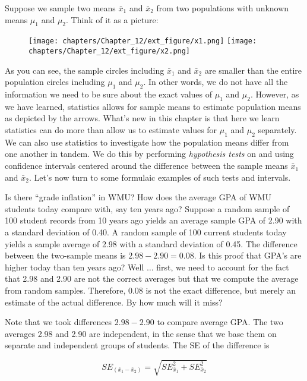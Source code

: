 \documentclass[11pt]{book}\usepackage[]{graphicx}\usepackage[]{color}
\begin{document}
Suppose we sample two means $\bar{x}_1$ and $\bar{x}_2$  from two populations with unknown means $\mu_1$ and $\mu_2$. Think of it as a picture:

\begin{figure}[ht]
\centering
\texttt{[image: chapters/Chapter\_12/ext\_figure/x1.png]} %
\texttt{[image: chapters/Chapter\_12/ext\_figure/x2.png]} %
\end{figure}

As you can see, the sample circles including $\bar{x}_1$ and $\bar{x}_2$ are smaller than the entire population circles including $\mu_1$ and $\mu_2$. In other words, we do not have all the information we need to be sure about the exact values of  $\mu_1$ and $\mu_2$. However, as we have learned, statistics allows for sample means to estimate population means as depicted by the arrows. What's new in this chapter is that here we learn statistics can do more than allow us to estimate values for $\mu_1$ and $\mu_2$ separately. We can also use statistics to investigate how the population means differ from one another in tandem. We do this by performing \textit{hypothesis tests} on and using confidence intervals centered around the difference between the sample means $\bar{x}_1$ and $\bar{x}_2$. Let's now turn to some formulaic examples of such tests and intervals.

Is there ``grade inflation'' in WMU?  How does the average GPA of WMU students today compare with, say ten years ago?  Suppose a random sample of 100 student records from 10 years ago yields an average sample GPA of 2.90 with a standard deviation of 0.40.  A random sample of 100 current students today yields a sample average of 2.98 with a standard deviation of 0.45.  The difference between the two-sample means is $2.98 - 2.90 = 0.08$.  Is this proof that GPA's are higher today than ten years ago?  Well $\dots$ first, we need to account for the fact that 2.98 and 2.90 are not the correct averages but that we compute the average from random samples.  Therefore, 0.08 is not the exact difference, but merely an estimate of the actual difference. By how much will it miss?

Note that we took differences $2.98 - 2.90$ to compare average GPA.  The two averages 2.98 and 2.90 are independent, in the sense that we base them on separate and independent groups of students.  The SE of the difference is

\begin{equation}
SE_{(\bar{x}_1 - \bar{x}_2)} = \sqrt{SE_{\bar{x}_1}^2 + SE_{\bar{x}_2}^2 }
\end{equation}
\end{document}
